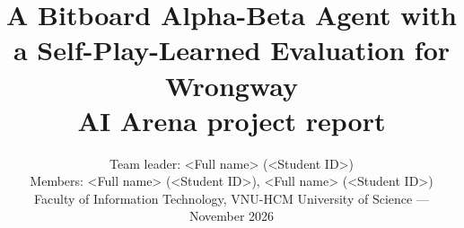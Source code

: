 \usepackage[T1]{fontenc}
\usepackage[utf8]{inputenc}
\usepackage{lmodern}
\usepackage{microtype}

\usepackage[a4paper,margin=2.4cm]{geometry}
\usepackage{setspace}
\usepackage[font=small,labelfont=bf]{caption}
\usepackage{titlesec}

\usepackage{amsmath,amssymb}
\usepackage{siunitx}
\usepackage{booktabs,tabularx,multirow}
\usepackage{graphicx}
\usepackage{xcolor}
\usepackage{enumitem}
\usepackage{tikz}
\usetikzlibrary{arrows.meta,positioning,shapes.geometric}
\usepackage{algorithm}
\usepackage{algpseudocode}

\usepackage[round,authoryear]{natbib}
\usepackage[hidelinks]{hyperref}
\usepackage{xurl}
\usepackage[capitalise,nameinlink]{cleveref}  %

\newcommand{\code}[1]{\texttt{#1}}

\title{\textbf{A Bitboard Alpha-Beta Agent with a Self-Play-Learned Evaluation for Wrongway}\\[2pt]
       \large AI Arena project report}
\author{Team leader: \textless Full name\textgreater{} (\textless Student ID\textgreater)\\
        Members: \textless Full name\textgreater{} (\textless Student ID\textgreater),
        \textless Full name\textgreater{} (\textless Student ID\textgreater)\\[2pt]
        \small Faculty of Information Technology, VNU-HCM University of Science --- November 2026}
\date{}


\maketitle

